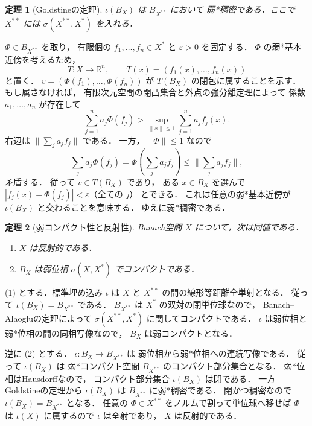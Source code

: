 \documentclass[a5paper,10pt,onecolumn]{jsarticle}
\makeatletter
\theoremstyle{mathnotetheorem}
\newtheorem{theorem}{定理}[section]
\renewcommand{\proofname}{証明}
\renewenvironment{proof}[1][\proofname]{%
  \par\pushQED{\qed}\normalfont\topsep4\p@\@plus2\p@\relax
  \trivlist\item[\hskip\labelsep\bfseries #1]\ignorespaces
}{\popQED\endtrivlist\@endpefalse}
\newcommand{\norm}[1]{\lVert #1\rVert}
\makeatother
\begin{document}
\begin{theorem}[Goldstineの定理]\label{thm:goldstine}
$\iota(B_X)$ は $B_{X^{**}}$ において
弱*稠密である．ここで $X^{**}$ には
$\sigma(X^{**},X^*)$ を入れる．
\end{theorem}
\begin{proof}
$\Phi\in B_{X^{**}}$ を取り，
有限個の $f_1,\dots,f_n\in X^*$ と $\varepsilon>0$ を固定する．
$\Phi$ の弱*基本近傍を考えるため，
\[
 T:X\to\mathbb R^n,\qquad
 T(x)=(f_1(x),\dots,f_n(x))
\]
と置く．
$v=(\Phi(f_1),\dots,\Phi(f_n))$ が
$T(B_X)$ の閉包に属することを示す．
もし属さなければ，
有限次元空間の閉凸集合と外点の強分離定理によって
係数 $a_1,\dots,a_n$ が存在して
\[
 \sum_{j=1}^na_j\Phi(f_j)
 >\sup_{\norm x\le1}\sum_{j=1}^na_j f_j(x).
\]
右辺は
$\norm{\sum_ja_jf_j}$ である．
一方，$\norm\Phi\le1$ なので
\[
 \sum_ja_j\Phi(f_j)
 =\Phi\left(\sum_ja_jf_j\right)
 \le\norm{\sum_ja_jf_j},
\]
矛盾する．
従って $v\in\overline{T(B_X)}$ であり，
ある $x\in B_X$ を選んで
$|f_j(x)-\Phi(f_j)|<\varepsilon$（全ての $j$）
とできる．
これは任意の弱*基本近傍が $\iota(B_X)$ と交わることを意味する．
ゆえに弱*稠密である．
\end{proof}

\begin{theorem}[弱コンパクト性と反射性]\label{thm:reflexive}
Banach空間 $X$ について，次は同値である．
\begin{enumerate}
\item $X$ は反射的である．
\item $B_X$ は弱位相 $\sigma(X,X^*)$ でコンパクトである．
\end{enumerate}
\end{theorem}
\begin{proof}
(1) とする．標準埋め込み $\iota$ は
$X$ と $X^{**}$ の間の線形等距離全単射となる．
従って $\iota(B_X)=B_{X^{**}}$ である．
$B_{X^{**}}$ は
$X^*$ の双対の閉単位球なので，
Banach--Alaogluの定理によって
$\sigma(X^{**},X^*)$ に関してコンパクトである．
$\iota$ は弱位相と弱*位相の間の同相写像なので，
$B_X$ は弱コンパクトとなる．

逆に (2) とする．
$\iota:B_X\to B_{X^{**}}$ は
弱位相から弱*位相への連続写像である．
従って $\iota(B_X)$ は
弱*コンパクト空間 $B_{X^{**}}$ のコンパクト部分集合となる．
弱*位相はHausdorffなので，
コンパクト部分集合 $\iota(B_X)$ は閉である．
一方 Goldstineの定理から
$\iota(B_X)$ は $B_{X^{**}}$ に弱*稠密である．
閉かつ稠密なので
$\iota(B_X)=B_{X^{**}}$ となる．
任意の $\Phi\in X^{**}$ をノルムで割って単位球へ移せば
$\Phi$ は $\iota(X)$ に属するので $\iota$ は全射であり，
$X$ は反射的である．
\end{proof}
\end{document}
